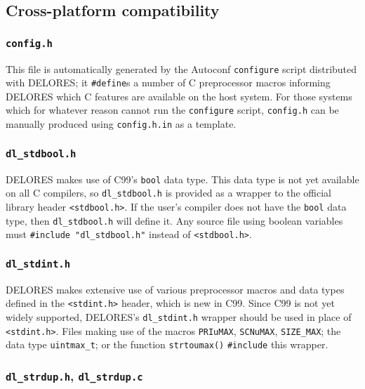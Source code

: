 \documentclass[a4paper,10pt,twocolumn]{article}
\begin{document}
\subsection{Cross-platform compatibility}

\subsubsection{\texttt{config.h}}

This file is automatically generated by the Autoconf
\texttt{configure} script distributed with DELORES; it
\texttt{\#define}s a number of C preprocessor macros informing DELORES
which C features are available on the host system.  For those systems
which for whatever reason cannot run the \texttt{configure} script,
\texttt{config.h} can be manually produced using \texttt{config.h.in}
as a template.

\subsubsection{\texttt{dl\_stdbool.h}}

DELORES makes use of C99's \texttt{bool} data type.  This data type is
not yet available on all C compilers, so \texttt{dl\_stdbool.h} is
provided as a wrapper to the official library header
\texttt{<stdbool.h>}.  If the user's compiler does not have the
\texttt{bool} data type, then \texttt{dl\_stdbool.h} will define it.
Any source file using boolean variables must \texttt{\#include
  "dl\_stdbool.h"} instead of \texttt{<stdbool.h>}.

\subsubsection{\texttt{dl\_stdint.h}}

DELORES makes extensive use of various preprocessor macros and data
types defined in the \texttt{<stdint.h>} header, which is new in C99.
Since C99 is not yet widely supported, DELORES's \texttt{dl\_stdint.h}
wrapper should be used in place of \texttt{<stdint.h>}.  Files making
use of the macros \texttt{PRIuMAX}, \texttt{SCNuMAX},
\texttt{SIZE\_MAX}; the data type \texttt{uintmax\_t}; or the function
\texttt{strtoumax()} \texttt{\#include} this wrapper.

\subsubsection{\texttt{dl\_strdup.h}, \texttt{dl\_strdup.c}}
\end{document}
